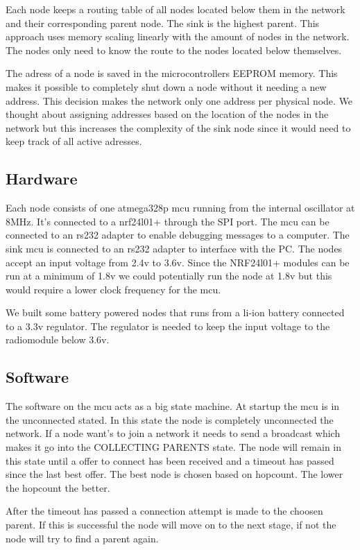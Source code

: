 \documentclass[a4paper,11pt]{article}
\begin{document}
Each node keeps a routing table of all nodes located below them in the
network and their corresponding parent node. The sink is the highest
parent. This approach uses memory scaling linearly with the amount of
nodes in the network. The nodes only need to know the route to the
nodes located below themselves.

The adress of a node is saved in the microcontrollers EEPROM memory.
This makes it possible to completely shut down a node without it 
needing a new address. This decision makes the network only one 
address per physical node. We thought about assigning addresses based
on the location of the nodes in the network but this increases 
the complexity of the sink node since it would need to keep track of
all active adresses.

\subsection{Hardware}
Each node consists of one atmega328p mcu running from the
internal oscillator at 8MHz. It's connected to a nrf24l01+ through the
SPI port. The mcu can be connected to an rs232 adapter to enable
debugging messages to a computer. The sink mcu is connected to an
rs232 adapter to interface with the PC. The nodes accept an input
voltage from 2.4v to 3.6v. Since the NRF24l01+ modules can be run at a
minimum of 1.8v we could potentially run the node at 1.8v but this
would require a lower clock frequency for the mcu\cite{Atmega}. 

We built some battery powered nodes that runs from a li-ion battery
connected to a 3.3v regulator. The regulator is needed to keep the 
input voltage to the radiomodule below 3.6v.

\subsection{Software}
The software on the mcu acts as a big state machine. At startup the
mcu is in the unconnected stated. In this state the node is completely
unconnected the network. If a node want's to join a network it needs
to send a broadcast which makes it go into the COLLECTING PARENTS
state. The node will remain in this state until a offer to connect has
been received and a timeout has passed since the last best offer. The
best node is chosen based on hopcount. The lower the hopcount the
better.

After the timeout has passed a connection attempt is made to the
choosen parent. If this is successful the node will move on to the
next stage, if not the node will try to find a parent again.
\end{document}
